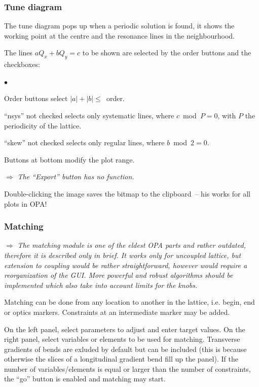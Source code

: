 \documentclass[12pt]{article}
\newenvironment{mylist}
  {\begin{list}{$\bullet$}{\parsep 0pt}}
  {\end{list}}
\newcommand\todo[1]{$\Longrightarrow$ {\em #1} }
\begin{document}
\subsubsection{\label{ssectun}Tune diagram}
The tune diagram pops up when a periodic solution is found, it shows the working
point at the centre and the resonance lines in the neighbourhood.

The lines $a Q_x + bQ_y = c$ to be
shown are selected by the order buttons and the checkboxes:
\begin{mylist}
\item Order buttons select $|a|+|b|\leq$~order.
\item ``nsys'' not checked selects only systematic lines, where $c$~mod~$P=0$, with $P$
the periodicity of the lattice.
\item ``skew'' not checked selects only regular lines, where $b$~mod~$2=0$.
\end{mylist}
Buttons at bottom modify the plot range.

\todo{The ``Export'' button has no function.}

Double-clicking the image saves the bitmap to the clipboard~-- his works for all plots in OPA!


\subsubsection{\label{ssecmat} Matching}

\todo{The matching module is one of the eldest OPA parts and rather outdated, therefore it is described only in brief. It works only for uncoupled lattice, but extension to coupling would be rather straightforward, however would require a reorganization of the GUI. More powerful and robust algorithms should be implemented which also take into account limits for the knobs.}

Matching can be done from any location to another in the lattice, i.e.
begin, end or optics markers. Constraints at an intermediate marker may
be added. 

On the left panel, select parameters to adjust and enter target values.
On the right panel, select variables or elements to be used for matching. Transverse gradients of bends are exluded by default but can be included (this is because otherwise the slices of a longitudinal gradient bend fill up the panel). If the number
of variables/elements is equal or larger than the number of constraints, the ``go'' button is enabled and matching may start. 
\end{document}

